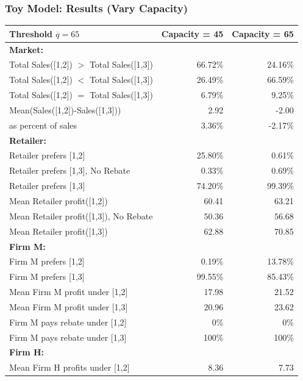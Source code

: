 \begin{frame}
  \frametitle{Toy Model:  Results (Vary Capacity)}
\begin{table}[htdp]\tiny
\begin{center}
\begin{tabular}{|l|rr|}
\hline
Threshold $\overline{q} = 65$   &Capacity = 45 & Capacity = 65\\
\hline
\bf{Market:}&&\\
Total Sales([1,2]) $>$ Total Sales([1,3])&66.72\%&24.16\%\\
Total Sales([1,2]) $<$ Total Sales([1,3])&26.49\%&66.59\%\\
Total Sales([1,2]) $=$ Total Sales([1,3])&6.79\%&9.25\%\\
Mean(Sales([1,2])-Sales([1,3]))&2.92 &-2.00 \\
\hspace{0.3in} as percent of sales&3.36\%&-2.17\%\\
\bf{Retailer:}&&\\
Retailer prefers [1,2]&25.80\%& 0.61\%\\
Retailer prefers [1,3], No Rebate &$0.33\%$ &$0.69\%$\\
Retailer prefers [1,3]& 74.20\%&99.39\%\\
Mean Retailer profit([1,2])&60.41&63.21\\
Mean Retailer profit([1,3]), No Rebate&$50.36$&$56.68$\\
Mean Retailer profit([1,3])&62.88&70.85\\
\bf{Firm M:}&&\\
Firm M prefers [1,2]&0.19\%&13.78\%\\
Firm M prefers [1,3]&99.55\%&85.43\%\\
Mean Firm M profit under [1,2]&17.98& 21.52\\
Mean Firm M profit under [1,3]&20.96& 23.62 \\
Firm M pays rebate under [1,2]&0\%&0\%\\
Firm M pays rebate under [1,3]&100\%&100\%\\
\bf{Firm H:}&&\\
Mean Firm H profits under [1,2]&8.36&7.73\\
\hline 
\end{tabular}
\label{toy_model}
\end{center}
\end{table}
\end{frame}


